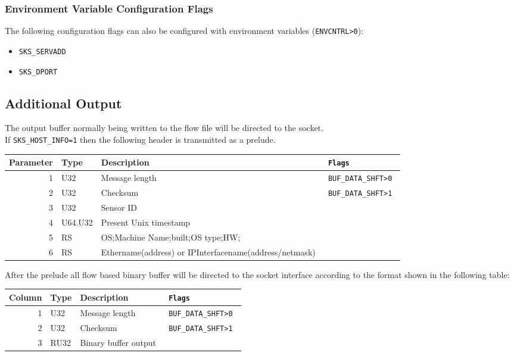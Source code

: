 \documentclass[documentation]{subfiles}
\begin{document}
\subsubsection{Environment Variable Configuration Flags}
The following configuration flags can also be configured with environment variables ({\tt ENVCNTRL>0}):
\begin{itemize}
    \item {\tt SKS\_SERVADD}
    \item {\tt SKS\_DPORT}
\end{itemize}

\subsection{Additional Output}
The output buffer normally being written to the flow file will be directed to the socket.\\

If {\tt SKS\_HOST\_INFO=1} then the following header is transmitted as a prelude.

\begin{longtable}{rll>{\tt\small}l}
    \toprule
    {\bf Parameter} & {\bf Type} & {\bf Description} & {\bf Flags}\\
    \midrule\endhead%
    1 & U32     & Message length                                         & BUF\_DATA\_SHFT>0 \\
    2 & U32     & Checksum                                               & BUF\_DATA\_SHFT>1 \\
    3 & U32     & Sensor ID                                              & \\
    4 & U64.U32 & Present Unix timestamp                                 & \\
    5 & RS      & OS;Machine Name;built;OS type;HW;                      & \\
    6 & RS      & Ethername(address) or IPInterfacename(address/netmask) & \\
    \bottomrule
\end{longtable}

After the prelude all flow based binary buffer will be directed to the socket interface according to the format shown in the following table:

\begin{longtable}{rll>{\tt\small}l}
    \toprule
    {\bf Column} & {\bf Type} & {\bf Description} & {\bf Flags}\\
    \midrule\endhead%
    1 & U32  & Message length       & BUF\_DATA\_SHFT>0 \\
    2 & U32  & Checksum             & BUF\_DATA\_SHFT>1 \\
    3 & RU32 & Binary buffer output & \\
    \bottomrule
\end{longtable}
\end{document}
